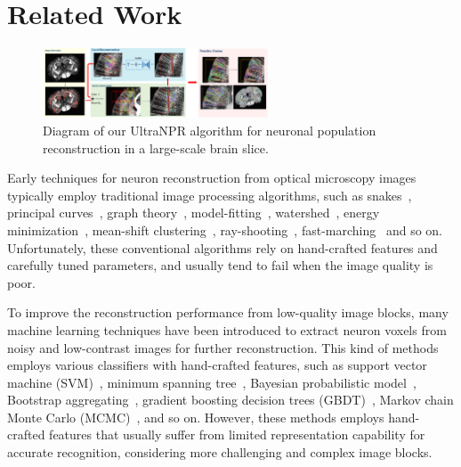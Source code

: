 \section{Related Work}
\label{sec:related work}
\begin{figure}[ht]
	\centering
	\includegraphics[width=0.6\textwidth]{./Illustrations/framework_ultranpr.PNG}
	\caption{Diagram of our UltraNPR algorithm for neuronal population reconstruction in a large-scale brain slice.}
	\label{fig:ultra_framework}
\end{figure}


Early techniques for neuron reconstruction from optical microscopy images typically employ traditional image processing algorithms, such as snakes~\cite{Wang2011, Cai2006}, principal curves~\cite{Bas2011}, graph theory~\cite{Peng2010a, Yang2013, De2016}, model-fitting~\cite{Zhao2011, Santamaria2015}, watershed~\cite{Navlakha2013, Suembuel2016}, energy minimization~\cite{Quan2013, Liu2016}, mean-shift clustering~\cite{Frasconi2014}, ray-shooting~\cite{Wu2014, Liu2019}, fast-marching~\cite{Peng2011, Xiao2013, Liu2018} and so on.
Unfortunately, these conventional algorithms rely on hand-crafted features and carefully tuned parameters, and usually tend to fail when the image quality is poor.

To improve the reconstruction performance from low-quality image blocks, many machine learning techniques have been introduced to extract neuron voxels from noisy and low-contrast images for further reconstruction. 
This kind of methods employs various classifiers with hand-crafted features, such as support vector machine (SVM)~\cite{Chen2015}, minimum spanning tree~\cite{Basu2016}, Bayesian probabilistic model~\cite{Radojevic2017}, Bootstrap aggregating~\cite{Wang2017}, gradient boosting decision trees (GBDT)~\cite{Gu2017}, Markov chain Monte Carlo (MCMC)~\cite{Skibbe2015, Skibbe2019}, and so on.
However, these methods employs hand-crafted features that usually suffer from limited representation capability for accurate recognition, considering more challenging and complex image blocks.


